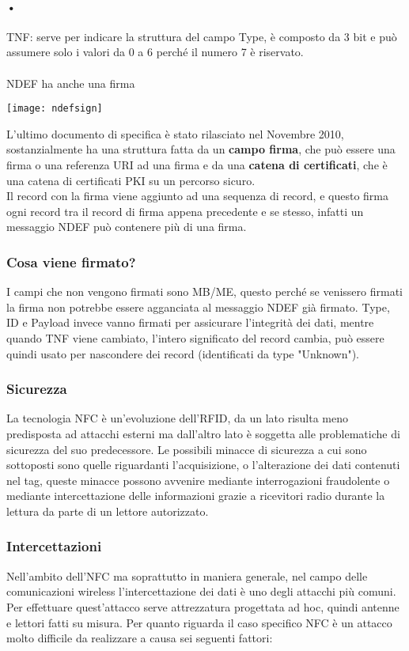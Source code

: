 \paragraph{•}TNF: serve per indicare la struttura del campo Type, è composto da 3 bit e può assumere solo i valori da 0 a 6 perché il numero 7 è riservato.
\\\\NDEF ha anche una firma
\begin{center}
\texttt{[image: ndefsign]}
\end{center}
L'ultimo documento di specifica è stato rilasciato nel Novembre 2010, sostanzialmente ha una struttura fatta da un \textbf{campo firma}, che può essere una firma o una referenza URI ad una firma e da una \textbf{catena di certificati}, che è una catena di certificati PKI su un percorso sicuro.
\\Il record con la firma viene aggiunto ad una sequenza di record, e questo firma ogni record tra il record di firma appena precedente e se stesso, infatti un messaggio NDEF può contenere più di una firma.
\subsubsection{Cosa viene firmato?}
I campi che non vengono firmati sono MB/ME, questo perché se venissero firmati la firma non potrebbe essere agganciata al messaggio NDEF già firmato. Type, ID e Payload invece vanno firmati per assicurare l'integrità dei dati, mentre quando TNF viene cambiato, l'intero significato del record cambia, può essere quindi usato per nascondere dei record (identificati da type "Unknown"). 
\subsubsection{Sicurezza}
La tecnologia NFC è un'evoluzione dell'RFID, da un lato risulta meno predisposta ad attacchi esterni ma dall'altro lato è soggetta alle problematiche di sicurezza del suo predecessore. Le possibili minacce di sicurezza a cui sono sottoposti sono quelle riguardanti l'acquisizione, o l'alterazione dei dati contenuti nel tag, queste minacce possono avvenire mediante interrogazioni fraudolente o mediante intercettazione delle informazioni grazie a ricevitori radio durante la lettura da parte di un lettore autorizzato.
\subsubsection{Intercettazioni}
Nell'ambito dell'NFC ma soprattutto in maniera generale, nel campo delle comunicazioni wireless l'intercettazione dei dati è uno degli attacchi più comuni. Per effettuare quest'attacco serve attrezzatura progettata ad hoc, quindi antenne e lettori fatti su misura. Per quanto riguarda il caso specifico NFC è un attacco molto difficile da realizzare a causa sei seguenti fattori:
